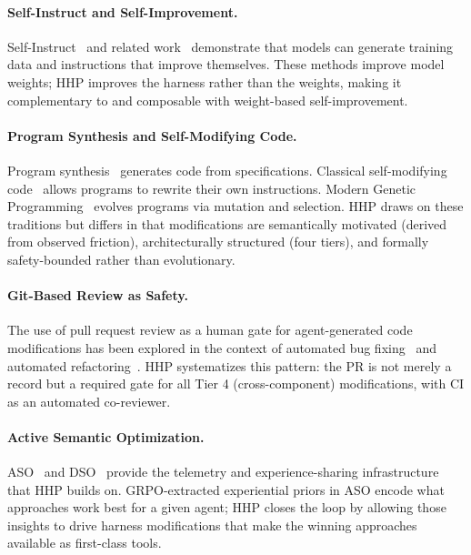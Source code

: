 \documentclass[11pt]{article}
\begin{document}
\paragraph{Self-Instruct and Self-Improvement.}
Self-Instruct~\cite{wang2022self} and related work~\cite{zelikman2022star,
yuan2023scaling} demonstrate that models can generate training data and
instructions that improve themselves. These methods improve model weights;
HHP improves the harness rather than the weights, making it complementary to
and composable with weight-based self-improvement.

\paragraph{Program Synthesis and Self-Modifying Code.}
Program synthesis~\cite{gulwani2017program} generates code from
specifications. Classical self-modifying code~\cite{holland1975adaptation}
allows programs to rewrite their own instructions. Modern Genetic
Programming~\cite{koza1994genetic} evolves programs via mutation and selection.
HHP draws on these traditions but differs in that modifications are semantically
motivated (derived from observed friction), architecturally structured (four
tiers), and formally safety-bounded rather than evolutionary.

\paragraph{Git-Based Review as Safety.}
The use of pull request review as a human gate for agent-generated code
modifications has been explored in the context of automated bug
fixing~\cite{sobania2023analysis} and automated refactoring~\cite{bavishi2019autopandas}.
HHP systematizes this pattern: the PR is not merely a record but a required
gate for all Tier 4 (cross-component) modifications, with CI as an automated
co-reviewer.

\paragraph{Active Semantic Optimization.}
ASO~\cite{hanzo2026aso} and DSO~\cite{hanzo2026dso} provide the telemetry and
experience-sharing infrastructure that HHP builds on. GRPO-extracted experiential
priors in ASO encode what approaches work best for a given agent; HHP closes the
loop by allowing those insights to drive harness modifications that make the
winning approaches available as first-class tools.
\end{document}
